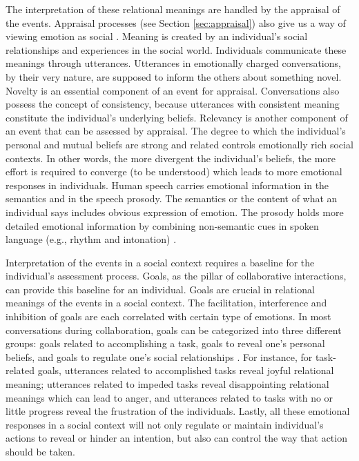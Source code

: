 \documentclass[12pt]{report}
\begin{document}
The interpretation of these relational meanings are handled by the appraisal of
the events. Appraisal processes (see Section \ref{sec:appraisal}) also
give us a way of viewing emotion as social \cite{hooft:sharing-emotions}. Meaning is
created by an individual's social relationships and experiences in the social
world. Individuals communicate these meanings through utterances. Utterances in
emotionally charged conversations, by their very nature, are supposed to inform
the others about something novel. Novelty is an essential component of an event
for appraisal. Conversations also possess the concept of consistency, because
utterances with consistent meaning constitute the individual's underlying
beliefs. Relevancy is another component of an event that can be assessed by
appraisal. The degree to which the individual's personal and mutual beliefs are
strong and related controls emotionally rich social contexts. In other words,
the more divergent the individual's beliefs, the more effort is required to
converge (to be understood) which leads to more emotional responses in
individuals. Human speech carries emotional information in the semantics and in
the speech prosody. The semantics or the content of what an individual says
includes obvious expression of emotion. The prosody holds more detailed
emotional information by combining non-semantic cues in spoken language (e.g.,
rhythm and intonation) \cite{luneski:emotion-aware-interaction}.

Interpretation of the events in a social context requires a baseline for the
individual's assessment process. Goals, as the pillar of collaborative
interactions, can provide this baseline for an individual. Goals are crucial in
relational meanings of the events in a social context. The facilitation,
interference and inhibition of goals are each correlated with certain type of
emotions. In most conversations during collaboration, goals can be categorized
into three different groups: goals related to accomplishing a task, goals to
reveal one's personal beliefs, and goals to regulate one's social relationships
\cite{planalp:communicating-emotion}. For instance, for task-related goals,
utterances related to accomplished tasks reveal joyful relational meaning;
utterances related to impeded tasks reveal disappointing relational meanings
which can lead to anger, and utterances related to tasks with no or little
progress reveal the frustration of the individuals. Lastly, all these emotional
responses in a social context will not only regulate or maintain individual's
actions to reveal or hinder an intention, but also can control the way that
action should be taken.
\end{document}
